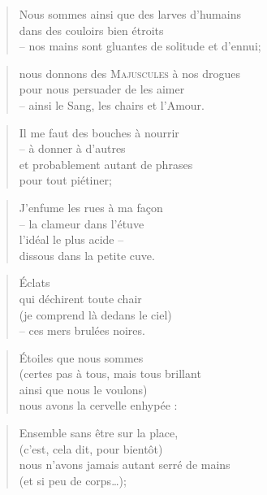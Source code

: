   \begin{verse}
    Nous sommes ainsi que des larves d’humains\\
    dans des couloirs bien étroits\\
    -- nos mains sont gluantes de solitude et d’ennui;
  \end{verse}
  \begin{verse}
    nous donnons des \textsc{Majuscules} à nos drogues\\
    pour nous persuader de les aimer\\
    -- ainsi le Sang, les chairs et l’Amour.
  \end{verse}
  \begin{verse}
    Il me faut des bouches à nourrir\\
    -- à donner à d’autres\\
    et probablement autant de phrases\\
    pour tout piétiner;
  \end{verse}
  \begin{verse}
    J’enfume les rues à ma façon\\
    -- la clameur dans l’étuve\\
    l’idéal le plus acide --\\
    dissous dans la petite cuve.
  \end{verse}
  \begin{verse}
    Éclats\\
    qui déchirent toute chair\\
    (je comprend là dedans le ciel)\\
    -- ces mers brulées noires.
  \end{verse}
  \begin{verse}
    Étoiles que nous sommes\\
    (certes pas à tous, mais tous brillant\\
    ainsi que nous le voulons)\\
    nous avons la cervelle enhypée :
  \end{verse}
  \begin{verse}
    Ensemble sans être sur la place,\\
    (c’est, cela dit, pour bientôt)\\
    nous n’avons jamais autant serré de mains\\
    (et si peu de corps…);
  \end{verse}
